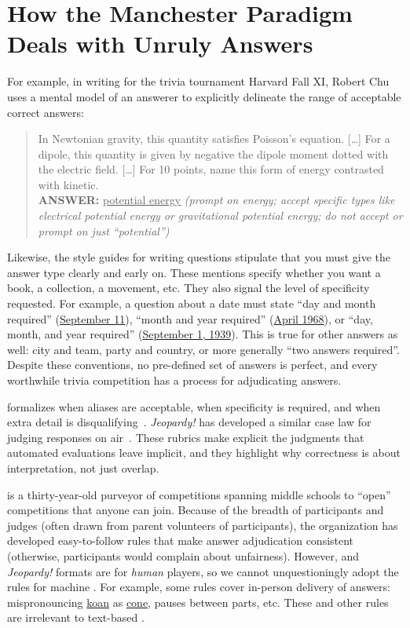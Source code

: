 \section{How the Manchester Paradigm Deals with Unruly Answers}

For example, in writing for the trivia tournament Harvard Fall XI,
Robert Chu uses a mental model of an answerer to explicitly delineate
the range of acceptable correct answers:
\begin{quote}
     In Newtonian gravity, this quantity satisfies Poisson's equation. [\dots] For a dipole, this quantity is given by negative the dipole moment dotted with the electric field. [\dots] For 10 points, name this form of energy contrasted with kinetic.\\
    {\bf ANSWER:} \underline{potential energy} \textit{(prompt on energy; accept specific types like electrical potential energy or gravitational potential energy; do not accept or prompt on just ``potential'')}
\end{quote}

Likewise, the style guides for writing questions stipulate that you
must give the answer type clearly and early on.
These mentions specify whether you want a book, a collection, a movement, etc.  
They also signal the level of specificity requested.
%
For example, a question about a date must state ``day and month
required'' (\underline{September 11}), ``month and year required''
(\underline{April 1968}), or ``day, month, and year required''
(\underline{September 1, 1939}).
This is true for other answers as well: city and team, party and
country, or more generally ``two answers required''.
Despite these conventions, no pre-defined set of answers is perfect,
and every worthwhile trivia competition has a process for adjudicating
answers.



 formalizes when aliases are acceptable, when specificity is
required, and when extra detail is disqualifying~\citep{naqt_correctness}.
\textit{Jeopardy!} has developed a similar case law for judging responses on
air~\citep{carberry_jeopardy_casebook}.
These rubrics make explicit the judgments that automated evaluations leave
implicit, and they highlight why correctness is about interpretation, not just
overlap.

 is a thirty-year-old purveyor of  competitions spanning
middle schools to ``open'' competitions that anyone can join.
%
Because of the breadth of participants and judges (often drawn from parent
volunteers of participants), the organization has developed easy-to-follow
rules that make answer adjudication consistent (otherwise, participants would
complain about unfairness).
%
However,  and \textit{Jeopardy!} formats are for
\emph{human} players, so we cannot unquestioningly adopt the rules for
machine .
%
For example, some rules cover in-person delivery of answers: mispronouncing
\underline{koan} as \underline{cone}, pauses between parts, etc.
%
These and other rules are irrelevant to text-based .

